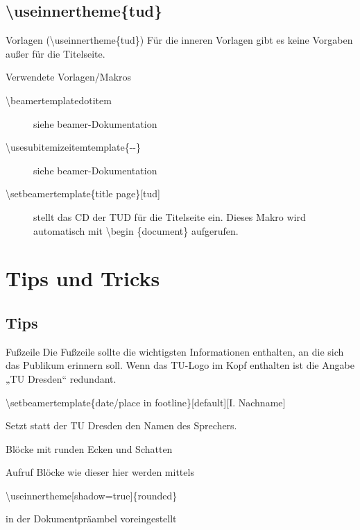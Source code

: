\documentclass[presentation,t]{beamer}
\begin{document}
\subsection{\textbackslash useinnertheme\{tud\}}
\label{sec:org8f00c94}

\begin{frame}[allowframebreaks]{Vorlagen (\textbackslash useinnertheme\{tud\})}
Für die inneren Vorlagen gibt es keine Vorgaben außer für die
Titelseite.
\begin{block}{Verwendete Vorlagen/Makros}
\begin{description}
\item[{\textbackslash beamertemplatedotitem}] siehe beamer-Dokumentation
\item[{\textbackslash usesubitemizeitemtemplate\{-\/-\}}] siehe
beamer-Dokumentation
\item[{\textbackslash setbeamertemplate\{title page\}[tud]}] stellt das CD
der TUD für die Titelseite ein. Dieses Makro wird automatisch mit
\textbackslash begin \{document\} aufgerufen.
\end{description}
\end{block}
\end{frame}

\section{Tips und Tricks}
\label{sec:org5e634fe}
\subsection{Tips}
\label{sec:org22b3c6a}
\begin{frame}[label={sec:org3cf35c6}]{Fußzeile}
Die Fußzeile sollte die wichtigsten Informationen enthalten, an die
sich das Publikum erinnern soll. Wenn das TU-Logo im Kopf enthalten
ist die Angabe „TU Dresden“ redundant.

\textbackslash setbeamertemplate\{date/place in
footline\}[default][I. Nachname]

Setzt statt der TU Dresden den Namen
des Sprechers.
\end{frame}
\begin{frame}[label={sec:org839ecfb}]{Blöcke mit runden Ecken und Schatten}
\begin{block}{Aufruf}
Blöcke wie dieser hier werden mittels 

\textbackslash useinnertheme[shadow=true]\{rounded\}

in der Dokumentpräambel voreingestellt
\end{block}
\end{frame}
\end{document}
